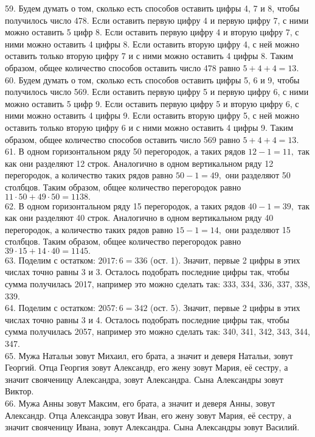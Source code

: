 59. Будем думать о том, сколько есть способов оставить цифры 4, 7 и 8, чтобы получилось число 478. Если оставить первую цифру 4 и первую цифру 7, с ними можно оставить 5 цифр 8. Если оставить первую цифру 4 и вторую цифру 7, с ними можно оставить 4 цифры 8. Если оставить вторую цифру 4, с ней можно оставить только вторую цифру 7 и с ними можно оставить 4 цифры 8. Таким образом, общее количество способов оставить число 478 равно $5+4+4=13.$\\
60. Будем думать о том, сколько есть способов оставить цифры 5, 6 и 9, чтобы получилось число 569. Если оставить первую цифру 5 и первую цифру 6, с ними можно оставить 5 цифр 9. Если оставить первую цифру 5 и вторую цифру 6, с ними можно оставить 4 цифры 9. Если оставить вторую цифру 5, с ней можно оставить только вторую цифру 6 и с ними можно оставить 4 цифры 9. Таким образом, общее количество способов оставить число 569 равно $5+4+4=13.$\\
61. В одном горизонтальном ряду 50 перегородок, а таких рядов $12-1=11,$ так как они разделяют 12 строк. Аналогично в одном вертикальном ряду 12 перегородок, а количество таких рядов равно $50-1=49,$ они разделяют 50 столбцов. Таким образом, общее количество перегородок равно $11\cdot50+49\cdot50=1138.$\\
62. В одном горизонтальном ряду 15 перегородок, а таких рядов $40-1=39,$ так как они разделяют 40 строк. Аналогично в одном вертикальном ряду 40 перегородок, а количество таких рядов равно $15-1=14,$ они разделяют 15 столбцов. Таким образом, общее количество перегородок равно $39\cdot15+14\cdot40=1145.$\\
63. Поделим с остатком: $2017:6=336$ (ост. 1). Значит, первые 2 цифры в этих числах точно равны 3 и 3. Осталось подобрать последние цифры так, чтобы сумма получилась 2017, например это можно сделать так: 333, 334, 336, 337, 338, 339.\\
64. Поделим с остатком: $2057:6=342$ (ост. 5). Значит, первые 2 цифры в этих числах точно равны 3 и 4. Осталось подобрать последние цифры так, чтобы сумма получилась 2057, например это можно сделать так: 340, 341, 342, 343, 344, 347.\\
65. Мужа Натальи зовут Михаил, его брата, а значит и деверя Натальи, зовут Георгий. Отца Георгия зовут Александр, его жену зовут Мария, её сестру, а значит свояченицу Александра, зовут Александра. Сына Александры зовут Виктор.\\
66. Мужа Анны зовут Максим, его брата, а значит и деверя Анны, зовут Александр. Отца Александра зовут Иван, его жену зовут Мария, её сестру, а значит свояченицу Ивана, зовут Александра. Сына Александры зовут Василий.\\
